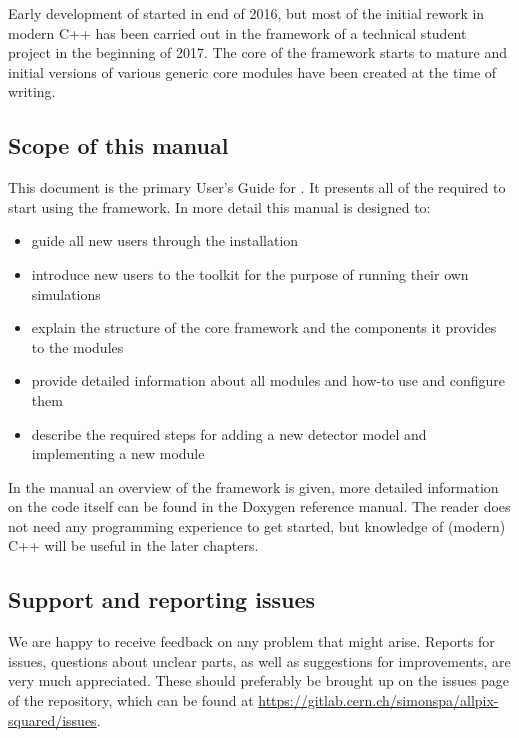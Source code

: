 Early development of \apsq started in end of 2016, but most of the initial rework in modern C++ has been carried out in the framework of a technical student project in the beginning of 2017. The core of the framework starts to mature and initial versions of various generic core modules have been created at the time of writing. 

\subsection{Scope of this manual}
This document is the primary User's Guide for \apsq. It presents all of the required to start using the framework. In more detail this manual is designed to:
\begin{itemize}
\item guide all new users through the installation 
\item introduce new users to the toolkit for the purpose of running their own simulations
\item explain the structure of the core framework and the components it provides to the modules
\item provide detailed information about all modules and how-to use and configure them
\item describe the required steps for adding a new detector model and implementing a new module
\end{itemize}

In the manual an overview of the framework is given, more detailed information on the code itself can be found in the Doxygen reference manual. The reader does not need any programming experience to get started, but knowledge of (modern) C++ will be useful in the later chapters.

\subsection{Support and reporting issues}
We are happy to receive feedback on any problem that might arise. Reports for issues, questions about unclear parts, as well as suggestions for improvements, are very much appreciated. These should preferably be brought up on the issues page of the repository, which can be found at \url{https://gitlab.cern.ch/simonspa/allpix-squared/issues}.
